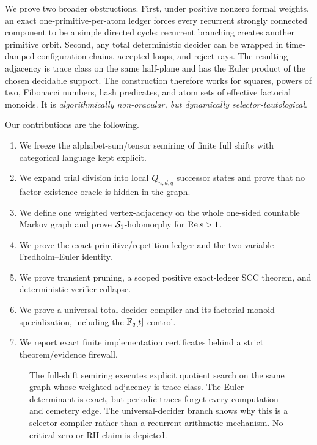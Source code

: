 We prove two broader obstructions.  First, under positive nonzero formal
weights, an exact one-primitive-per-atom ledger forces every recurrent
strongly connected component to be a simple directed cycle: recurrent
branching creates another primitive orbit.  Second, any total deterministic
decider can be wrapped in time-damped configuration chains, accepted loops,
and reject rays.  The resulting adjacency is trace class on the same
half-plane and has the Euler product of the chosen decidable support.  The
construction therefore works for squares, powers of two, Fibonacci numbers,
hash predicates, and atom sets of effective factorial monoids.  It is
\emph{algorithmically non-oracular, but dynamically selector-tautological}.

Our contributions are the following.

\begin{enumerate}
\item We freeze the alphabet-sum/tensor semiring of finite full shifts with
  categorical language kept explicit.
\item We expand trial division into local $Q_{n,d,q}$ successor states and
  prove that no factor-existence oracle is hidden in the graph.
\item We define one weighted vertex-adjacency on the whole one-sided
  countable Markov graph and prove $\mathcal S_1$-holomorphy for $\operatorname{Re} s>1$.
\item We prove the exact primitive/repetition ledger and the two-variable
  Fredholm--Euler identity.
\item We prove transient pruning, a scoped positive exact-ledger SCC theorem,
  and deterministic-verifier collapse.
\item We prove a universal total-decider compiler and its factorial-monoid
  specialization, including the $\mathbb F_q[t]$ control.
\item We report exact finite implementation certificates behind a strict
  theorem/evidence firewall.
\end{enumerate}

\begin{figure}[t]
\centering

\caption{The full-shift semiring executes explicit quotient search on the
same graph whose weighted adjacency is trace class.  The Euler determinant
is exact, but periodic traces forget every computation and cemetery edge.
The universal-decider branch shows why this is a selector compiler rather
than a recurrent arithmetic mechanism.  No critical-zero or RH claim is
depicted.}
\label{fig:overview}
\end{figure}

